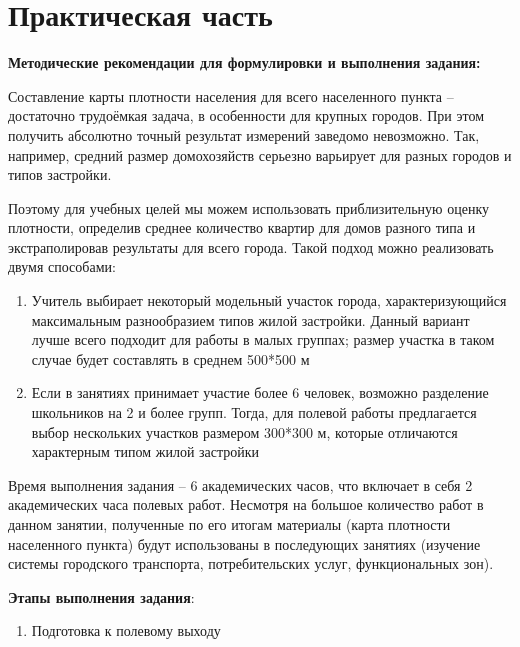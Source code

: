 \documentclass[
  11pt,
  russian,
]{book}
\providecommand{\tightlist}{%
  \setlength{\itemsep}{0pt}\setlength{\parskip}{0pt}}
\begin{document}
\hypertarget{ux43fux440ux430ux43aux442ux438ux447ux435ux441ux43aux430ux44f-ux447ux430ux441ux442ux44c-1}{%
\section*{Практическая часть}\label{ux43fux440ux430ux43aux442ux438ux447ux435ux441ux43aux430ux44f-ux447ux430ux441ux442ux44c-1}}

\textbf{Методические рекомендации для формулировки и выполнения задания:}

Составление карты плотности населения для всего населенного пункта -- достаточно трудоёмкая задача, в особенности для крупных городов. При этом получить абсолютно точный результат измерений заведомо невозможно. Так, например, средний размер домохозяйств серьезно варьирует для разных городов и типов застройки.

Поэтому для учебных целей мы можем использовать приблизительную оценку плотности, определив среднее количество квартир для домов разного типа и экстраполировав результаты для всего города. Такой подход можно реализовать двумя способами:

\begin{enumerate}
\def\labelenumi{\arabic{enumi})}
\item
  Учитель выбирает некоторый модельный участок города, характеризующийся максимальным разнообразием типов жилой застройки. Данный вариант лучше всего подходит для работы в малых группах; размер участка в таком случае будет составлять в среднем 500*500 м
\item
  Если в занятиях принимает участие более 6 человек, возможно разделение школьников на 2 и более групп. Тогда, для полевой работы предлагается выбор нескольких участков размером 300*300 м, которые отличаются характерным типом жилой застройки
\end{enumerate}

Время выполнения задания -- 6 академических часов, что включает в себя 2 академических часа полевых работ. Несмотря на большое количество работ в данном занятии, полученные по его итогам материалы (карта плотности населенного пункта) будут использованы в последующих занятиях (изучение системы городского транспорта, потребительских услуг, функциональных зон).

\textbf{Этапы выполнения задания}:

\begin{enumerate}
\def\labelenumi{\arabic{enumi}.}
\tightlist
\item
  Подготовка к полевому выходу
\end{enumerate}
\end{document}
